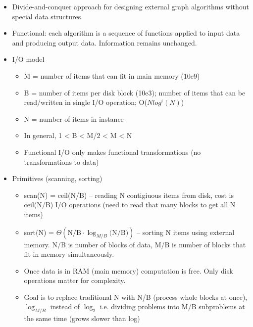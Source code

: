 \begin{itemize}
    \item Divide-and-conquer approach for designing external graph algorithms without special data structures
    \item Functional: each algorithm is a sequence of functions applied to input data and producing output data. Information remains unchanged. 
    \item I/O model
    \begin{itemize}
        \item M = number of items that can fit in main memory (10e9)
        \item B = number of items per disk block (10e3); number of items that can be read/written in single I/O operation; O($N log^i(N)$)
        \item N = number of items in instance
        \item In general, 1 < B < M/2 < M < N
        \item Functional I/O only makes functional transformations (no transformations to data)
    \end{itemize}
    \item Primitives (scanning, sorting)
    \begin{itemize}
        \item scan(N) = ceil(N/B) -- reading N contigiuous items from disk, cost is ceil(N/B) I/O operations (need to read that many blocks to get all N items)
        \item sort(N) = $\Theta(\text{N/B} \cdot \log_{M/B}\text{(N/B)})$ -- sorting N items using external memory. N/B is number of blocks of data, M/B is number of blocks that fit in memory  simultaneously.
        \item Once data is in RAM (main memory) computation is free. Only disk operations matter for complexity.
        \item Goal is to replace traditional N with N/B (process whole blocks at once), $\log_{M/B}$ instead of $\log_2$ i.e. dividing problems into M/B subproblems at the same time (grows slower than log)
    \end{itemize}
\end{itemize}

